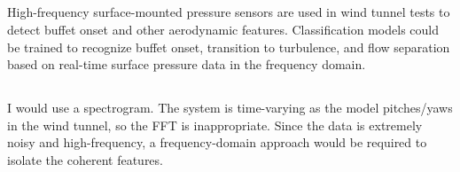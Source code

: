 \documentclass[11pt]{article}
\begin{document}
\subsection{} %
\begin{mdframed}
    High-frequency surface-mounted pressure sensors are used in wind tunnel
    tests to detect buffet onset and other aerodynamic features. Classification
    models could be trained to recognize buffet onset, transition to turbulence,
    and flow separation based on real-time surface pressure data in the
    frequency domain.
\end{mdframed}

\subsection{} %
\begin{mdframed}
    I would use a spectrogram. The system is time-varying as the model
    pitches/yaws in the wind tunnel, so the FFT is inappropriate. Since the data
    is extremely noisy and high-frequency, a frequency-domain approach would be
    required to isolate the coherent features.
\end{mdframed}
\end{document}

